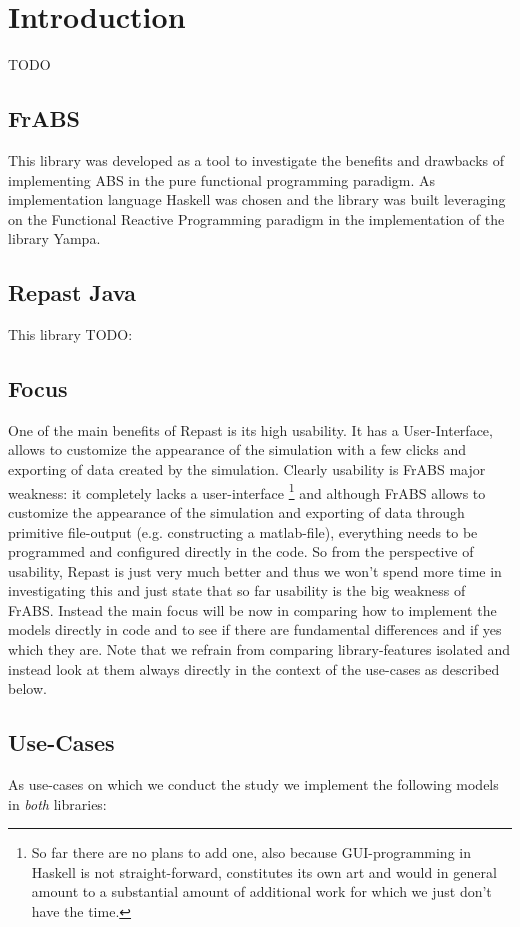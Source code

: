 \section{Introduction}

TODO

\subsection{FrABS}
This library was developed as a tool to investigate the benefits and drawbacks of implementing ABS in the pure functional programming paradigm. As implementation language Haskell was chosen and the library was built leveraging on the Functional Reactive Programming paradigm in the implementation of the library Yampa.

\subsection{Repast Java}
This library TODO:

\subsection{Focus}
One of the main benefits of Repast is its high usability. It has a User-Interface, allows to customize the appearance of the simulation with a few clicks and exporting of data created by the simulation. Clearly usability is FrABS major weakness: it completely lacks a user-interface \footnote{So far there are no plans to add one, also because GUI-programming in Haskell is not straight-forward, constitutes its own art and would in general amount to a substantial amount of additional work for which we just don't have the time.} and although FrABS allows to customize the appearance of the simulation and exporting of data through primitive file-output (e.g. constructing a matlab-file), everything needs to be programmed and configured directly in the code. So from the perspective of usability, Repast is just very much better and thus we won't spend more time in investigating this and just state that so far usability is the big weakness of FrABS. 
Instead the main focus will be now in comparing how to implement the models directly in code and to see if there are fundamental differences and if yes which they are. Note that we refrain from comparing library-features isolated and instead look at them always directly in the context of the use-cases as described below.

\subsection{Use-Cases}
As use-cases on which we conduct the study we implement the following models in \textit{both} libraries:

